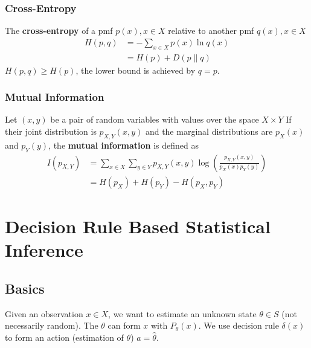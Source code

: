 \documentclass[11pt]{elegantbook}
\begin{document}
\subsection{Cross-Entropy}
\begin{definition}
    The \textbf{cross-entropy} of a pmf $p(x),x\in X$ relative to another pmf $q(x), x\in X$
    \begin{equation}
        \begin{aligned}
            H(p, q)&=-\sum_{x\in X}p(x)\ln q(x)\\&=H(p)+D(p\| q)
        \end{aligned}
        \nonumber
    \end{equation}
    $H(p,q)\geq H(p)$, the lower bound is achieved by $q=p$.
\end{definition}

\subsection{Mutual Information}
\begin{definition}
    Let $(x,y)$ be a pair of random variables with values over the space $X\times Y$ If their joint distribution is $p_{X,Y}(x,y)$ and the marginal distributions are $p_X(x)$ and $p_Y(y)$, the \textbf{mutual information} is defined as
    \begin{equation}
        \begin{aligned}
            I(p_{X,Y})&=\sum_{x\in X}\sum_{y\in Y}p_{X,Y}(x,y)\log\left(\frac{p_{X,Y}(x,y)}{p_X(x)p_Y(y)}\right)\\
            &=H(p_X)+H(p_Y)-H(p_X,p_Y)
        \end{aligned}
        \nonumber
    \end{equation}
\end{definition}





\chapter{Decision Rule Based Statistical Inference}
\section{Basics}
Given an observation $x\in X$, we want to estimate an unknown state $\theta \in S$ (not necessarily random). The $\theta$ can form $x$ with $P_\theta(x)$. We use decision rule $\delta (x)$ to form an action (estimation of $\theta$) $a=\hat{\theta}$.
\end{document}
